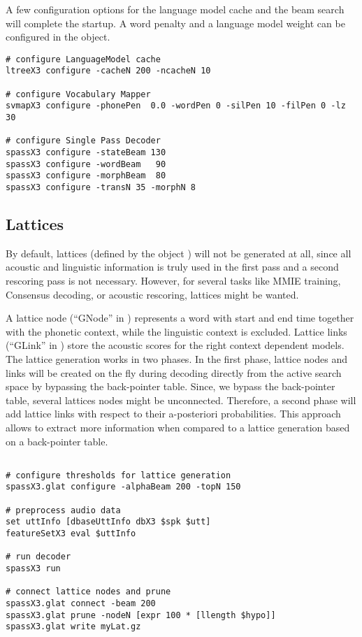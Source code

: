 A few configuration options for the language model cache and the beam search
will complete the startup. A word penalty and a language model weight can be
configured in the  object.

\begin{verbatim}
# configure LanguageModel cache
ltreeX3 configure -cacheN 200 -ncacheN 10

# configure Vocabulary Mapper
svmapX3 configure -phonePen  0.0 -wordPen 0 -silPen 10 -filPen 0 -lz 30

# configure Single Pass Decoder
spassX3 configure -stateBeam 130
spassX3 configure -wordBeam   90
spassX3 configure -morphBeam  80
spassX3 configure -transN 35 -morphN 8
\end{verbatim}


\subsection{Lattices}

By default, lattices (defined  by the object ) will
not be generated at all, since all acoustic and linguistic information
is truly  used in the  first pass and  a second  rescoring  pass is not
necessary. However,  for several tasks  like MMIE  training, Consensus
decoding, or acoustic rescoring, lattices might be wanted.

A  lattice node (``GNode''  in  ) represents a word
with start and end time together  with the phonetic context, while the
linguistic context  is    excluded.   Lattice  links   (``GLink''   in
)  store the acoustic  scores for the right context
dependent models. The  lattice generation works  in two phases. In the
first phase, lattice nodes and links will be created on the fly during
decoding  directly  from  the active  search   space by bypassing  the
back-pointer table.  Since, we  bypass  the back-pointer table,  several
lattices nodes might  be unconnected.  Therefore,  a second phase will
add lattice  links    with       respect to  their        a-posteriori
probabilities. This  approach   allows  to extract    more information
when compared to a lattice generation based on a back-pointer table.

\begin{verbatim}

# configure thresholds for lattice generation  
spassX3.glat configure -alphaBeam 200 -topN 150

# preprocess audio data
set uttInfo [dbaseUttInfo dbX3 $spk $utt]
featureSetX3 eval $uttInfo

# run decoder
spassX3 run

# connect lattice nodes and prune
spassX3.glat connect -beam 200
spassX3.glat prune -nodeN [expr 100 * [llength $hypo]]
spassX3.glat write myLat.gz

\end{verbatim}

